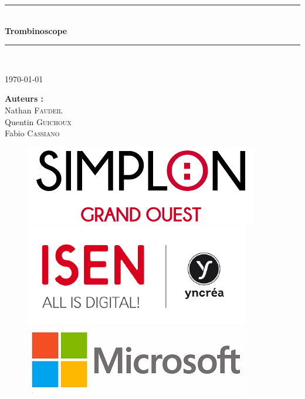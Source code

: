 \documentclass[french]{article}
\begin{document}
\begin{titlepage}

\newcommand{\HRule}{\rule{\linewidth}{0.5mm}} %

\center %
 
\HRule \\[0.4cm]
\vspace{1cm}
{ \huge \bfseries Trombinoscope}\\ %
\vspace{1cm}
\HRule \\[1cm]
 
\vspace{1cm}

\Large \today

\vspace{3cm}

\begin{minipage}{0.4\textwidth}
\begin{center}
\Large \textbf{Auteurs :}\\
\vspace{0.5cm}
Nathan \textsc{Faudeil} \\
Quentin \textsc{Guichoux}\\
Fabio \textsc{Cassiano}
\end{center}
\end{minipage}

\vspace{5cm}

\begin{figure}[!ht]
	\includegraphics[height=0.1\columnwidth]{Image/logo/logo_simplon.png}
	\hspace*{0.5cm}
	\includegraphics[height=0.12\columnwidth]{Image/logo/logo_Isen.png}
	\hspace*{0.5cm}
	\includegraphics[height=0.1\columnwidth]{Image/logo/logo_microsoft.jpg}
\end{figure}

\vfill

\end{titlepage}
\end{document}

